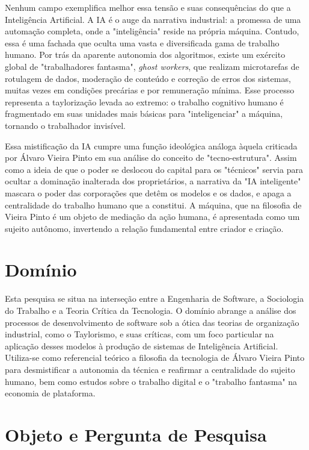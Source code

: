 Nenhum campo exemplifica melhor essa tensão e suas consequências do que a Inteligência Artificial. A IA é o auge da narrativa industrial: a promessa de uma automação completa, 
onde a "inteligência" reside na própria máquina. Contudo, essa é uma fachada que oculta uma vasta e diversificada gama de trabalho humano. Por trás da aparente autonomia dos 
algoritmos, existe um exército global de "trabalhadores fantasma", \textit{ghost workers}, que realizam microtarefas de rotulagem de dados, moderação de conteúdo e correção de erros dos 
sistemas, muitas vezes em condições precárias e por remuneração mínima. Esse processo representa a taylorização levada ao extremo: o trabalho cognitivo humano é fragmentado em 
suas unidades mais básicas para "inteligenciar" a máquina, tornando o trabalhador invisível.   

Essa mistificação da IA cumpre uma função ideológica análoga àquela criticada por Álvaro Vieira Pinto em sua análise do conceito de "tecno-estrutura". Assim como a ideia de que 
o poder se deslocou do capital para os "técnicos" servia para ocultar a dominação inalterada dos proprietários, a narrativa da "IA inteligente" mascara o poder das corporações 
que detêm os modelos e os dados, e apaga a centralidade do trabalho humano que a constitui. A máquina, que na filosofia de Vieira Pinto é um objeto de mediação da ação humana, 
é apresentada como um sujeito autônomo, invertendo a relação fundamental entre criador e criação.   

\section{Domínio}\label{sec:dominio}

Esta pesquisa se situa na interseção entre a Engenharia de Software, a Sociologia do Trabalho e a Teoria Crítica da Tecnologia. O domínio abrange a análise dos processos de 
desenvolvimento de software sob a ótica das teorias de organização industrial, como o Taylorismo, e suas críticas, com um foco particular na aplicação desses modelos à produção 
de sistemas de Inteligência Artificial. Utiliza-se como referencial teórico a filosofia da tecnologia de Álvaro Vieira Pinto para desmistificar a autonomia da técnica e 
reafirmar a centralidade do sujeito humano, bem como estudos sobre o trabalho digital e o "trabalho fantasma" na economia de plataforma.

\section{Objeto e Pergunta de Pesquisa}\label{sec:obj_pergunta_pesquisa}

